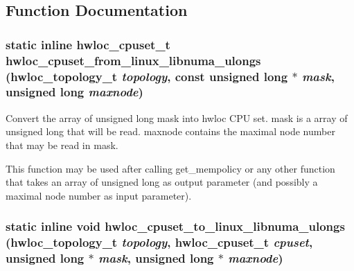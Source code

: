 \subsection{Function Documentation}
\hypertarget{group__hwlocality__linux__libnuma__ulongs_gaad80d59fee26a1e0ecf7a0bae76dc685}{
\subsubsection[{hwloc\_\-cpuset\_\-from\_\-linux\_\-libnuma\_\-ulongs}]{\setlength{\rightskip}{0pt plus 5cm}static inline {\bf hwloc\_\-cpuset\_\-t} hwloc\_\-cpuset\_\-from\_\-linux\_\-libnuma\_\-ulongs ({\bf hwloc\_\-topology\_\-t} {\em topology}, \/  const unsigned long $\ast$ {\em mask}, \/  unsigned long {\em maxnode})}}
\label{group__hwlocality__linux__libnuma__ulongs_gaad80d59fee26a1e0ecf7a0bae76dc685}


Convert the array of unsigned long {\ttfamily mask} into hwloc CPU set. {\ttfamily mask} is a array of unsigned long that will be read. {\ttfamily maxnode} contains the maximal node number that may be read in {\ttfamily mask}.

This function may be used after calling get\_\-mempolicy or any other function that takes an array of unsigned long as output parameter (and possibly a maximal node number as input parameter). \hypertarget{group__hwlocality__linux__libnuma__ulongs_ga7119f03aa7437b027edea3a32ebce265}{
\subsubsection[{hwloc\_\-cpuset\_\-to\_\-linux\_\-libnuma\_\-ulongs}]{\setlength{\rightskip}{0pt plus 5cm}static inline void hwloc\_\-cpuset\_\-to\_\-linux\_\-libnuma\_\-ulongs ({\bf hwloc\_\-topology\_\-t} {\em topology}, \/  {\bf hwloc\_\-cpuset\_\-t} {\em cpuset}, \/  unsigned long $\ast$ {\em mask}, \/  unsigned long $\ast$ {\em maxnode})}}
\label{group__hwlocality__linux__libnuma__ulongs_ga7119f03aa7437b027edea3a32ebce265}


